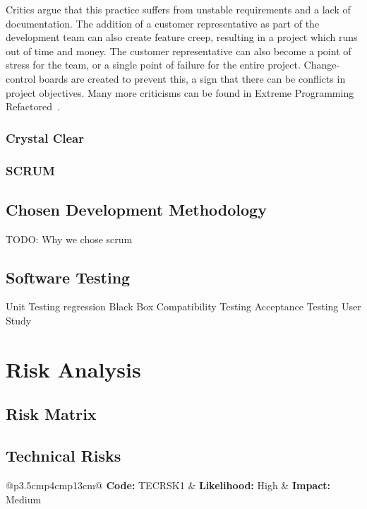\documentclass[11pt,a4paper]{article}
\renewcommand{\arraystretch}{1.5}
\begin{document}
Critics argue that this practice suffers from unstable requirements and a lack of documentation. The addition of a customer representative as part of the development team can also create feature creep, resulting in a project which runs out of time and
money. The customer representative can also become a point of stress for the team, or a single point of failure for the entire project. Change-control boards are created to prevent this, a sign that there can be conflicts in project objectives. Many more criticisms can be found in Extreme Programming Refactored~\cite{xpRefactored}.


\subsubsection{Crystal Clear}

\subsubsection{SCRUM}

\subsection{Chosen Development Methodology}
TODO: Why we chose scrum

\subsection{Software Testing}
Unit Testing
	regression
	Black Box
Compatibility Testing
Acceptance Testing
User Study

\section{Risk Analysis}
\label{sec:risk-analysis}

\subsection{Risk Matrix}

\subsection{Technical Risks}
\label{sec:tech-risks}

\renewcommand{\arraystretch}{1.2}

\noindent\begin{tabular}{@{}p{3.5cm}p{4cm}p{13cm}@{}}
\textbf{Code:} TECRSK1 & \textbf{Likelihood:} High & \textbf{Impact:} Medium \\ 
 \\ 
 \\ 
\end{tabular} 
\end{document}
